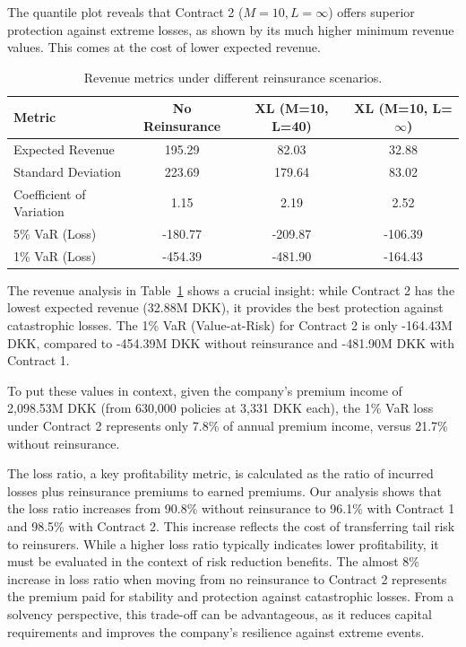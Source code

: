 \documentclass[8pt]{article}
\begin{document}
%

The quantile plot reveals that Contract 2 ($M=10, L=\infty$) offers superior protection against extreme losses, as shown by its much higher minimum revenue values. This comes at the cost of lower expected revenue.

\begin{table}[h]
    \centering
    \begin{tabular}{lccc}
        \toprule
        \textbf{Metric} & \textbf{No Reinsurance} & \textbf{XL (M=10, L=40)} & \textbf{XL (M=10, L=$\infty$)} \\
        \midrule
        Expected Revenue & 195.29 & 82.03 & 32.88 \\
        Standard Deviation & 223.69 & 179.64 & 83.02 \\
        Coefficient of Variation & 1.15 & 2.19 & 2.52 \\
        5\% VaR (Loss) & -180.77 & -209.87 & -106.39 \\
        1\% VaR (Loss) & -454.39 & -481.90 & -164.43 \\
        \bottomrule
    \end{tabular}
    \vspace{1em}
    \caption{Revenue metrics under different reinsurance scenarios.}
    \label{tab:revenue-metrics}
\end{table}

The revenue analysis in Table~\ref{tab:revenue-metrics} shows a crucial insight: while Contract 2 has the lowest expected revenue (32.88M DKK), it provides the best protection against catastrophic losses. The 1\% VaR (Value-at-Risk) for Contract 2 is only -164.43M DKK, compared to -454.39M DKK without reinsurance and -481.90M DKK with Contract 1.

To put these values in context, given the company's premium income of 2,098.53M DKK (from 630,000 policies at 3,331 DKK each), the 1\% VaR loss under Contract 2 represents only 7.8\% of annual premium income, versus 21.7\% without reinsurance.

The loss ratio, a key profitability metric, is calculated as the ratio of incurred losses plus reinsurance premiums to earned premiums. Our analysis shows that the loss ratio increases from 90.8\% without reinsurance to 96.1\% with Contract 1 and 98.5\% with Contract 2. This increase reflects the cost of transferring tail risk to reinsurers. While a higher loss ratio typically indicates lower profitability, it must be evaluated in the context of risk reduction benefits. The almost 8\% increase in loss ratio when moving from no reinsurance to Contract 2 represents the premium paid for stability and protection against catastrophic losses. From a solvency perspective, this trade-off can be advantageous, as it reduces capital requirements and improves the company's resilience against extreme events.
\end{document}
